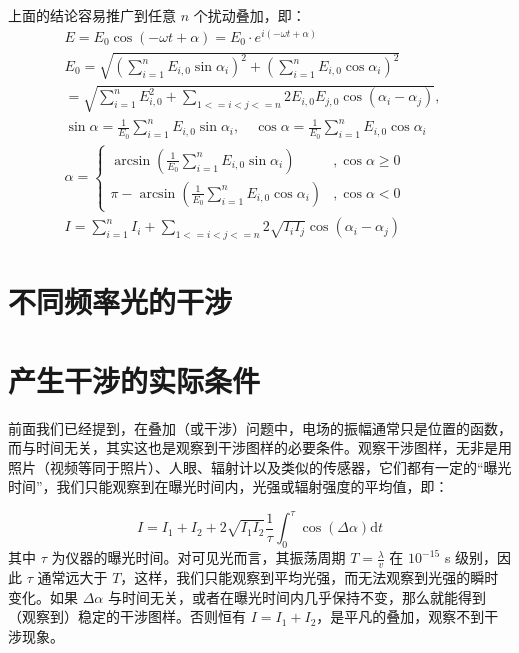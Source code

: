 \documentclass[UTF8]{report}
\theoremstyle{MyLineTheoremStyle} %
\theoremstyle{MyBlockTheoremStyle} %
\theoremstyle{MySubsubsectionStyle} %
\begin{document}
上面的结论容易推广到任意 $n$ 个扰动叠加，即：
\begin{gather}
    E = E_0 \cos \left(-\omega t + \alpha \right) = E_0 \cdot e^{i(-\omega t + \alpha)}
    \\ 
    E_0 = \sqrt{\left( \sum_{i=1}^n E_{i,0}\sin \alpha_i \right)^2 + \left( \sum_{i=1}^n E_{i,0}\cos \alpha_i \right)^2 }   \\ 
    =  \sqrt{\sum_{i=1}^n E_{i,0}^2 + \sum_{1 <= i < j <= n} 2E_{i,0}E_{j,0}\cos(\alpha_i - \alpha_j)},\quad
    \\ 
    \sin \alpha = \frac{1}{E_0}\sum_{i=1}^n E_{i,0}\sin \alpha_i ,\quad 
    \cos \alpha = \frac{1}{E_0}\sum_{i=1}^n E_{i,0}\cos \alpha_i \\ 
    \alpha = 
    \begin{cases}
        \arcsin \left( \frac{1}{E_0}\sum_{i=1}^n E_{i,0}\sin \alpha_i  \right) &, \cos \alpha \geqslant 0 \\
        \pi - \arcsin \left( \frac{1}{E_0}\sum_{i=1}^n E_{i,0}\cos \alpha_i  \right) &,  \cos \alpha < 0
    \end{cases} \\ 
    I = \sum_{i=1}^n I_i + \sum_{1 <= i < j <= n} 2\sqrt{I_iI_j} \cos(\alpha_i - \alpha_j) 
\end{gather}

\section{不同频率光的干涉}

\section{产生干涉的实际条件}

前面我们已经提到，在叠加（或干涉）问题中，电场的振幅通常只是位置的函数，而与时间无关，其实这也是观察到干涉图样的必要条件。观察干涉图样，无非是用照片（视频等同于照片）、人眼、辐射计以及类似的传感器，它们都有一定的“曝光时间”，我们只能观察到在曝光时间内，光强或辐射强度的平均值，即：

\begin{equation}
I = I_1 + I_2 + 2 \sqrt{I_1 I_2} \frac{1}{\tau} \int_{0}^{\tau}  \cos(\Delta \alpha) \mathrm{d} t
\end{equation}
其中 $\tau$ 为仪器的曝光时间。对可见光而言，其振荡周期 $T = \frac{\lambda}{v}$ 在 $10^{-15}$ s 级别，因此 $\tau$ 通常远大于 $T$，这样，我们只能观察到平均光强，而无法观察到光强的瞬时变化。如果 $\Delta \alpha$ 与时间无关，或者在曝光时间内几乎保持不变，那么就能得到（观察到）稳定的干涉图样。否则恒有 $I = I_1 + I_2$，是平凡的叠加，观察不到干涉现象。
\end{document}
